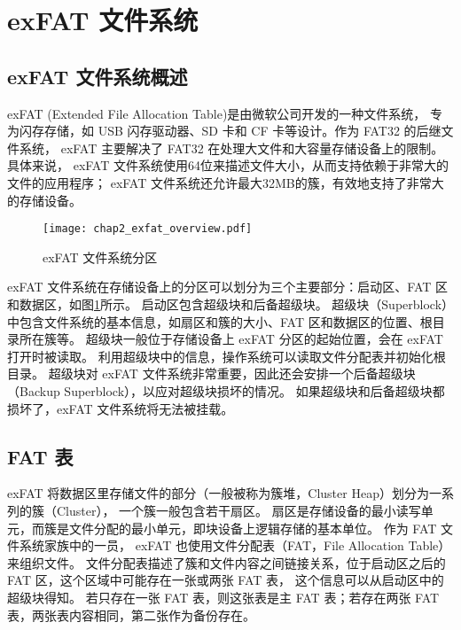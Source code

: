 \section{exFAT 文件系统}
\subsection{exFAT 文件系统概述}
exFAT (Extended File Allocation Table)\parencite{exFAT}\parencite{exFAT1}\parencite{exFAT2}是由微软公司开发的一种文件系统，
专为闪存存储，如 USB 闪存驱动器、SD 卡和 CF 卡等设计。作为 FAT32\parencite{russinovich2009windows} 的后继文件系统，
exFAT 主要解决了 FAT32 在处理大文件和大容量存储设备上的限制。具体来说，
exFAT 文件系统使用64位来描述文件大小，从而支持依赖于非常大的文件的应用程序；
exFAT 文件系统还允许最大32MB的簇，有效地支持了非常大的存储设备。

\begin{figure}[h]
    \centering
    \texttt{[image: chap2\_exfat\_overview.pdf]}
    \caption{exFAT 文件系统分区}
    \label{fig:exfat_overview}
\end{figure}

exFAT 文件系统在存储设备上的分区可以划分为三个主要部分：启动区、FAT 区和数据区，如图\ref{fig:exfat_overview}所示。
启动区包含超级块和后备超级块。
超级块（Superblock）中包含文件系统的基本信息，如扇区和簇的大小、FAT 区和数据区的位置、根目录所在簇等。
超级块一般位于存储设备上 exFAT 分区的起始位置，会在 exFAT 打开时被读取。
利用超级块中的信息，操作系统可以读取文件分配表并初始化根目录。
超级块对 exFAT 文件系统非常重要，因此还会安排一个后备超级块（Backup Superblock），以应对超级块损坏的情况。
如果超级块和后备超级块都损坏了，exFAT 文件系统将无法被挂载。

\subsection{FAT 表}\label{subsec:fat}
exFAT 将数据区里存储文件的部分（一般被称为簇堆，Cluster Heap）划分为一系列的簇（Cluster），
一个簇一般包含若干扇区。
扇区是存储设备的最小读写单元，而簇是文件分配的最小单元，即块设备上逻辑存储的基本单位。
作为 FAT 文件系统家族中的一员， exFAT 也使用文件分配表（FAT，File Allocation Table）\parencite{anderson2016fat}来组织文件。
文件分配表描述了簇和文件内容之间链接关系，位于启动区之后的 FAT 区，这个区域中可能存在一张或两张 FAT 表，
这个信息可以从启动区中的超级块得知。
若只存在一张 FAT 表，则这张表是主 FAT 表；若存在两张 FAT 表，两张表内容相同，第二张作为备份存在。

